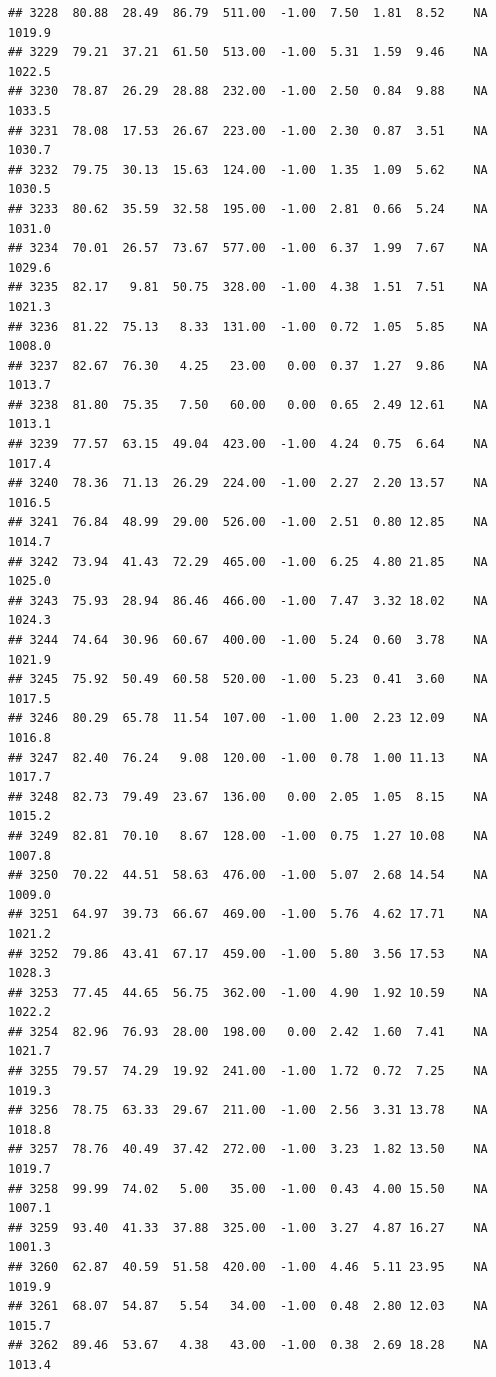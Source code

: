\documentclass{article}\usepackage{graphicx, color}
\makeatletter
\newenvironment{kframe}{%
 \def\at@end@of@kframe{}%
 \ifinner\ifhmode%
  \def\at@end@of@kframe{\end{minipage}}%
  \begin{minipage}{\columnwidth}%
 \fi\fi%
 \def\FrameCommand##1{\hskip\@totalleftmargin \hskip-\fboxsep
 \colorbox{shadecolor}{##1}\hskip-\fboxsep
     \hskip-\linewidth \hskip-\@totalleftmargin \hskip\columnwidth}%
 \MakeFramed {\advance\hsize-\width
   \@totalleftmargin\z@ \linewidth\hsize
   \@setminipage}}%
 {\par\unskip\endMakeFramed%
 \at@end@of@kframe}
\newenvironment{knitrout}{}{} %
\makeatother
\begin{document}
\begin{knitrout}
\begin{kframe}
\begin{verbatim}
## 3228  80.88  28.49  86.79  511.00  -1.00  7.50  1.81  8.52    NA 1019.9
## 3229  79.21  37.21  61.50  513.00  -1.00  5.31  1.59  9.46    NA 1022.5
## 3230  78.87  26.29  28.88  232.00  -1.00  2.50  0.84  9.88    NA 1033.5
## 3231  78.08  17.53  26.67  223.00  -1.00  2.30  0.87  3.51    NA 1030.7
## 3232  79.75  30.13  15.63  124.00  -1.00  1.35  1.09  5.62    NA 1030.5
## 3233  80.62  35.59  32.58  195.00  -1.00  2.81  0.66  5.24    NA 1031.0
## 3234  70.01  26.57  73.67  577.00  -1.00  6.37  1.99  7.67    NA 1029.6
## 3235  82.17   9.81  50.75  328.00  -1.00  4.38  1.51  7.51    NA 1021.3
## 3236  81.22  75.13   8.33  131.00  -1.00  0.72  1.05  5.85    NA 1008.0
## 3237  82.67  76.30   4.25   23.00   0.00  0.37  1.27  9.86    NA 1013.7
## 3238  81.80  75.35   7.50   60.00   0.00  0.65  2.49 12.61    NA 1013.1
## 3239  77.57  63.15  49.04  423.00  -1.00  4.24  0.75  6.64    NA 1017.4
## 3240  78.36  71.13  26.29  224.00  -1.00  2.27  2.20 13.57    NA 1016.5
## 3241  76.84  48.99  29.00  526.00  -1.00  2.51  0.80 12.85    NA 1014.7
## 3242  73.94  41.43  72.29  465.00  -1.00  6.25  4.80 21.85    NA 1025.0
## 3243  75.93  28.94  86.46  466.00  -1.00  7.47  3.32 18.02    NA 1024.3
## 3244  74.64  30.96  60.67  400.00  -1.00  5.24  0.60  3.78    NA 1021.9
## 3245  75.92  50.49  60.58  520.00  -1.00  5.23  0.41  3.60    NA 1017.5
## 3246  80.29  65.78  11.54  107.00  -1.00  1.00  2.23 12.09    NA 1016.8
## 3247  82.40  76.24   9.08  120.00  -1.00  0.78  1.00 11.13    NA 1017.7
## 3248  82.73  79.49  23.67  136.00   0.00  2.05  1.05  8.15    NA 1015.2
## 3249  82.81  70.10   8.67  128.00  -1.00  0.75  1.27 10.08    NA 1007.8
## 3250  70.22  44.51  58.63  476.00  -1.00  5.07  2.68 14.54    NA 1009.0
## 3251  64.97  39.73  66.67  469.00  -1.00  5.76  4.62 17.71    NA 1021.2
## 3252  79.86  43.41  67.17  459.00  -1.00  5.80  3.56 17.53    NA 1028.3
## 3253  77.45  44.65  56.75  362.00  -1.00  4.90  1.92 10.59    NA 1022.2
## 3254  82.96  76.93  28.00  198.00   0.00  2.42  1.60  7.41    NA 1021.7
## 3255  79.57  74.29  19.92  241.00  -1.00  1.72  0.72  7.25    NA 1019.3
## 3256  78.75  63.33  29.67  211.00  -1.00  2.56  3.31 13.78    NA 1018.8
## 3257  78.76  40.49  37.42  272.00  -1.00  3.23  1.82 13.50    NA 1019.7
## 3258  99.99  74.02   5.00   35.00  -1.00  0.43  4.00 15.50    NA 1007.1
## 3259  93.40  41.33  37.88  325.00  -1.00  3.27  4.87 16.27    NA 1001.3
## 3260  62.87  40.59  51.58  420.00  -1.00  4.46  5.11 23.95    NA 1019.9
## 3261  68.07  54.87   5.54   34.00  -1.00  0.48  2.80 12.03    NA 1015.7
## 3262  89.46  53.67   4.38   43.00  -1.00  0.38  2.69 18.28    NA 1013.4

\end{verbatim}
\end{kframe}
\end{knitrout}
\end{document}

